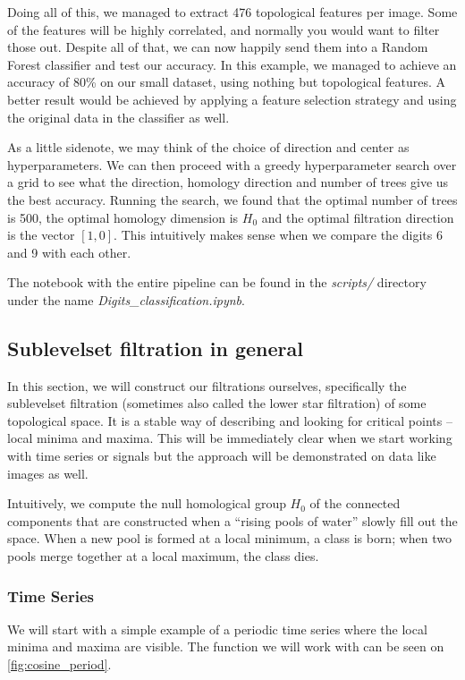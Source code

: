 Doing all of this, we managed to extract 476 topological features per image. Some of the features will be highly correlated, and normally you would want to filter those out. Despite all of that, we can now happily send them into a Random Forest classifier and test our accuracy. In this example, we managed to achieve an accuracy of 80\% on our small dataset, using nothing but topological features. A better result would be achieved by applying a feature selection strategy and using the original data in the classifier as well.

As a little sidenote, we may think of the choice of direction and center as hyperparameters. We can then proceed with a greedy hyperparameter search over a grid to see what the direction, homology direction and number of trees give us the best accuracy. Running the search, we found that the optimal number of trees is 500, the optimal homology dimension is $H_{0}$ and the optimal filtration direction is the vector $[1, 0]$. This intuitively makes sense when we compare the digits 6 and 9 with each other.

The notebook with the entire pipeline can be found in the \textit{scripts/} directory under the name \textit{Digits\_classification.ipynb}.

\subsection{Sublevelset filtration in general}
In this section, we will construct our filtrations ourselves, specifically the sublevelset filtration (sometimes also called the lower star filtration) of some topological space. It is a stable way of describing and looking for critical points -- local minima and maxima. This will be immediately clear when we start working with time series or signals but the approach will be demonstrated on data like images as well.

Intuitively, we compute the null homological group $H_{0}$ of the connected components that are constructed when a ``rising pools of water'' slowly fill out the space. When a new pool is formed at a local minimum, a class is born; when two pools merge together at a local maximum, the class dies.

\subsubsection{Time Series}
We will start with a simple example of a periodic time series where the local minima and maxima are visible. The function we will work with can be seen on \ref{fig:cosine_period}.

